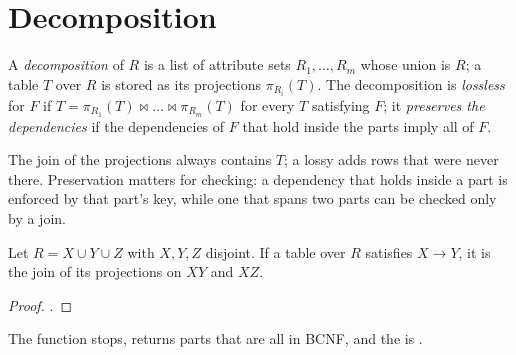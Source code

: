 \section{Decomposition}\label{sec:b2:database-design:decomposition}

\begin{definition}\label{def:b2:database-design:decomposition}
A \emph{decomposition} of $R$ is a list of attribute sets $R_1, \dots, R_m$ whose union is $R$; a table
$T$ over $R$ is stored as its projections $\pi_{R_i}(T)$. The decomposition is
\emph{lossless} for $F$ if $T = \pi_{R_1}(T) \bowtie \dots \bowtie \pi_{R_m}(T)$ for
every $T$ satisfying $F$; it \emph{preserves the dependencies} if the dependencies of $F$
that hold inside the parts imply all of $F$.
\end{definition}

The join of the projections always contains $T$; a lossy  adds rows that were never there. Preservation
matters for checking: a dependency that holds inside a part is enforced by that part's key, while one that spans two
parts can be checked only by a join.

\begin{theorem}\label{thm:b2:database-design:heath}
Let $R = X \cup Y \cup Z$ with $X, Y, Z$ disjoint. If a table over $R$ satisfies $X \to Y$, it is the join of its
projections on $XY$ and $XZ$.
\end{theorem}

\begin{proof}
.
\end{proof}

\label{lst:b2:database-design:bcnf}

\begin{theorem}\label{thm:b2:database-design:bcnf-lossless}
The function  stops, returns parts that are all in BCNF, and the  is .
\end{theorem}

